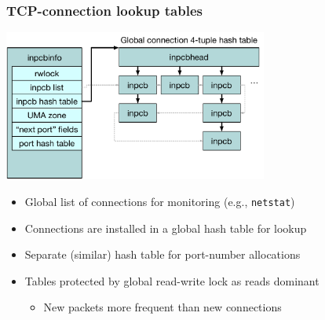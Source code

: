 \begin{frame}
  \frametitle{TCP-connection lookup tables}

  \begin{center}
    \includegraphics[width=0.65\textwidth]{../../figures/tcp-hash-table.pdf}
  \end{center}

  \begin{itemize}
    \item Global list of connections for monitoring (e.g., \texttt{netstat})
    \item Connections are installed in a global hash table for lookup
    \item Separate (similar) hash table for port-number allocations
    \item Tables protected by global read-write lock as reads dominant
    \begin{itemize}
      \item New packets more frequent than new connections
    \end{itemize}
  \end{itemize}
\end{frame}

%
%

